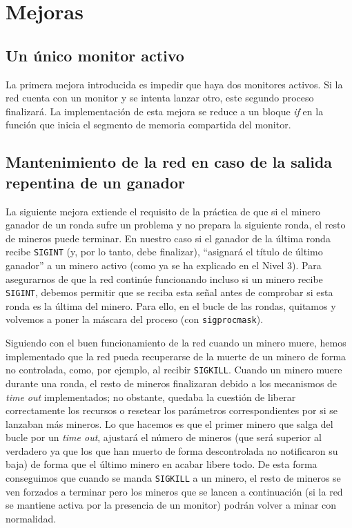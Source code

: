 \documentclass{article}
\begin{document}
\section*{Mejoras}

\subsection*{Un único monitor activo}
La primera mejora introducida es impedir que haya dos monitores activos. Si la red cuenta con un monitor y se intenta lanzar otro, este segundo proceso finalizará. La implementación de esta mejora se reduce a un bloque \emph{if} en la función que inicia el segmento de memoria compartida del monitor.

\subsection*{Mantenimiento de la red en caso de la salida repentina de un ganador}
La siguiente mejora extiende el requisito de la práctica de que si el minero ganador de un ronda sufre un problema y no prepara la siguiente ronda, el resto de mineros puede terminar. En nuestro caso si el ganador de la última ronda recibe \texttt{SIGINT} (y, por lo tanto, debe finalizar), ``asignará el título de último ganador'' a un minero activo (como ya se ha explicado en el Nivel 3). Para asegurarnos de que la red continúe funcionando incluso si un minero recibe \texttt{SIGINT}, debemos permitir que se reciba esta señal antes de comprobar si esta ronda es la última del minero. Para ello, en el bucle de las rondas, quitamos y volvemos a poner la máscara del proceso (con \texttt{sigprocmask}). 

Siguiendo con el buen funcionamiento de la red cuando un minero muere, hemos implementado que la red pueda recuperarse de la muerte de un minero de forma no controlada, como, por ejemplo, al recibir \texttt{SIGKILL}. Cuando un minero muere durante una ronda, el resto de mineros finalizaran debido a los mecanismos de \textit{time out} implementados; no obstante, quedaba la cuestión de liberar correctamente los recursos o resetear los parámetros correspondientes por si se lanzaban más mineros. Lo que hacemos es que el primer minero que salga del bucle por un \textit{time out}, ajustará el número de mineros (que será superior al verdadero ya que los que han muerto de forma descontrolada no notificaron su baja) de forma que el último minero en acabar libere todo. De esta forma conseguimos que cuando se manda \texttt{SIGKILL} a un minero, el resto de mineros se ven forzados a terminar pero los mineros que se lancen a continuación (si la red se mantiene activa por la presencia de un monitor) podrán volver a minar con normalidad.
\end{document}
